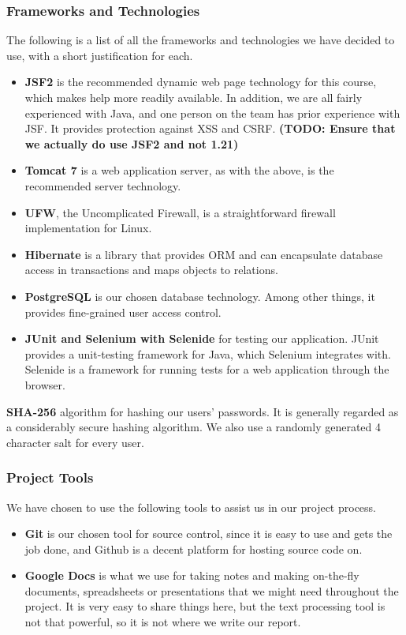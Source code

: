 \documentclass[a4paper]{article}
\begin{document}
\subsubsection{Frameworks and Technologies}
The following is a list of all the frameworks and technologies we have decided to use, with a short justification for each.
\begin{itemize}
\item \textbf{JSF2} is the recommended dynamic web page technology for this course, which makes help more readily available. In addition, we are all fairly experienced with Java, and one person on the team has prior experience with JSF. It provides protection against XSS and CSRF. \textbf{(TODO: Ensure that we actually do use JSF2 and not 1.21)}
\item \textbf{Tomcat 7} is a web application server, as with the above, is the recommended server technology.
\item \textbf{UFW}, the Uncomplicated Firewall, is a straightforward firewall implementation for Linux.
\item \textbf{Hibernate} is a library that provides ORM and can encapsulate database access in transactions and maps objects to relations.
\item \textbf{PostgreSQL} is our chosen database technology. Among other things, it provides fine-grained user access control.
\item \textbf{JUnit and Selenium with Selenide} for testing our application. JUnit provides a unit-testing framework for Java, which Selenium integrates with. Selenide is a framework for running tests for a web application through the browser.
\end{itemize}


\textbf{SHA-256} algorithm for hashing our users' passwords. It is generally regarded as a considerably secure hashing algorithm.
We also use a randomly generated 4 character salt for every user.

\subsubsection{Project Tools}
We have chosen to use the following tools to assist us in our project process.
\begin{itemize}
\item \textbf{Git} is our chosen tool for source control, since it is easy to use and gets the job done, and Github is a decent platform for hosting source code on.
\item \textbf{Google Docs} is what we use for taking notes and making on-the-fly documents, spreadsheets or presentations that we might need throughout the project. It is very easy to share things here, but the text processing tool is not that powerful, so it is not where we write our report.
\end{itemize}
\end{document}
